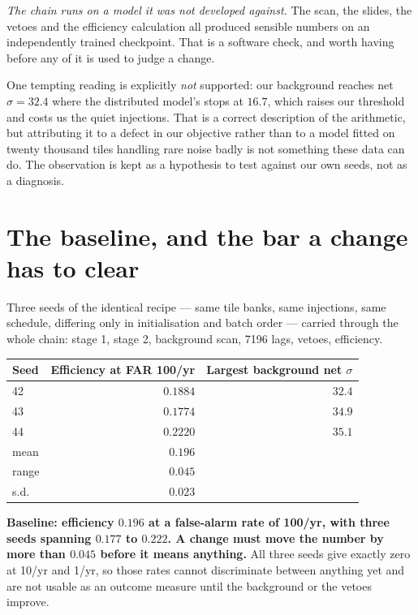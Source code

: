 \documentclass[11pt]{article}
\begin{document}
\emph{The chain runs on a model it was not developed against.} The scan, the slides, the
vetoes and the efficiency calculation all produced sensible numbers on an independently
trained checkpoint. That is a software check, and worth having before any of it is used
to judge a change.

One tempting reading is explicitly \emph{not} supported: our background reaches net
$\sigma = 32.4$ where the distributed model's stops at $16.7$, which raises our threshold
and costs us the quiet injections. That is a correct description of the arithmetic, but
attributing it to a defect in our objective rather than to a model fitted on twenty
thousand tiles handling rare noise badly is not something these data can do. The
observation is kept as a hypothesis to test against our own seeds, not as a diagnosis.

\section{The baseline, and the bar a change has to clear}
\label{sec:baseline}

Three seeds of the identical recipe --- same tile banks, same injections, same schedule,
differing only in initialisation and batch order --- carried through the whole chain:
stage 1, stage 2, background scan, 7196 lags, vetoes, efficiency.

\begin{center}
\begin{tabular}{lrr}
\toprule
Seed & Efficiency at FAR 100/yr & Largest background net $\sigma$ \\
\midrule
42 & $0.1884$ & $32.4$ \\
43 & $0.1774$ & $34.9$ \\
44 & $0.2220$ & $35.1$ \\
\midrule
mean & $\mathbf{0.196}$ & \\
range & $0.045$ & \\
s.d.\ & $0.023$ & \\
\bottomrule
\end{tabular}
\end{center}

\textbf{Baseline: efficiency $0.196$ at a false-alarm rate of 100/yr, with three seeds
spanning $0.177$ to $0.222$. A change must move the number by more than $0.045$ before it
means anything.} All three seeds give exactly zero at 10/yr and 1/yr, so those rates
cannot discriminate between anything yet and are not usable as an outcome measure until
the background or the vetoes improve.
\end{document}
